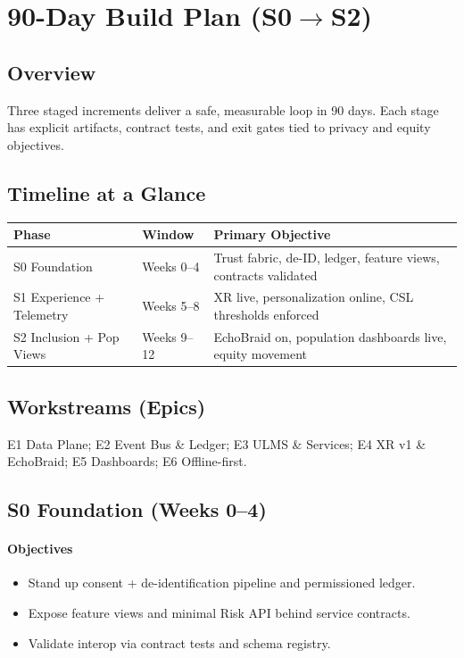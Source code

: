 \documentclass[11pt]{article}
\theoremstyle{plain}
\begin{document}
\section{90-Day Build Plan (S0$\rightarrow$S2)}

\subsection{Overview}
Three staged increments deliver a safe, measurable loop in 90 days. Each stage has explicit artifacts, contract tests, and exit gates tied to privacy and equity objectives.

\subsection{Timeline at a Glance}
\begin{center}
\begin{tabular}{l l l}
\hline
\textbf{Phase} & \textbf{Window} & \textbf{Primary Objective} \\
\hline
S0 Foundation & Weeks 0--4  & Trust fabric, de-ID, ledger, feature views, contracts validated \\
S1 Experience + Telemetry & Weeks 5--8  & XR live, personalization online, CSL thresholds enforced \\
S2 Inclusion + Pop Views & Weeks 9--12 & EchoBraid on, population dashboards live, equity movement \\
\hline
\end{tabular}
\end{center}

\subsection{Workstreams (Epics)}
E1 Data Plane; E2 Event Bus \& Ledger; E3 ULMS \& Services; E4 XR v1 \& EchoBraid; E5 Dashboards; E6 Offline-first.

\subsection{S0 Foundation (Weeks 0--4)}
\paragraph{Objectives}
\begin{itemize}
  \item Stand up consent + de-identification pipeline and permissioned ledger.
  \item Expose feature views and minimal Risk API behind service contracts.
  \item Validate interop via contract tests and schema registry.
\end{itemize}
\end{document}
